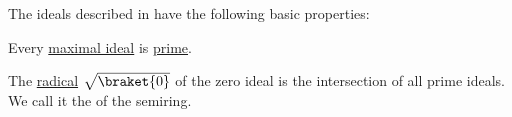 \begin{proposition}\label{thm:def:derived_semiring_ideals/properties}
  The ideals described in  have the following basic properties:
  \begin{thmenum}
     Every \hyperref[def:derived_semiring_ideals/maximal]{maximal ideal} is \hyperref[def:derived_semiring_ideals/prime]{prime}.

     The \hyperref[def:derived_semiring_ideals/radical]{radical} \( \sqrt {\braket{0}} \) of the zero ideal is the intersection of all prime ideals. We call it the  of the semiring.
  \end{thmenum}
\end{proposition}
